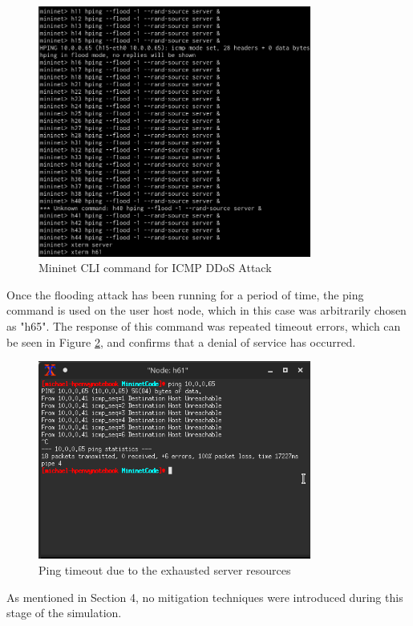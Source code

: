 \begin{figure}[H]
	\centering
	\includegraphics[width=0.8\textwidth]{images/icmpFloodDDoSCli2}
	\caption{Mininet CLI command for ICMP DDoS Attack}
	\label{fig:images-icmpFloodDDoSCli2}
\end{figure}

Once the flooding attack has been running for a period of time, the ping command
is used on the user host node, which in this case was arbitrarily chosen as
"h65". The response of this command was repeated timeout errors, which can be
seen in Figure \ref{fig:images-icmpFloodDDoSCli}, and confirms that a denial of
service has occurred.

\begin{figure}[H]
	\centering
	\includegraphics[width=0.8\textwidth]{images/icmpFloodDDoSCli}
	\caption{Ping timeout due to the exhausted server resources}
	\label{fig:images-icmpFloodDDoSCli}
\end{figure}

As mentioned in Section 4, no mitigation techniques were introduced during this
stage of the simulation.
